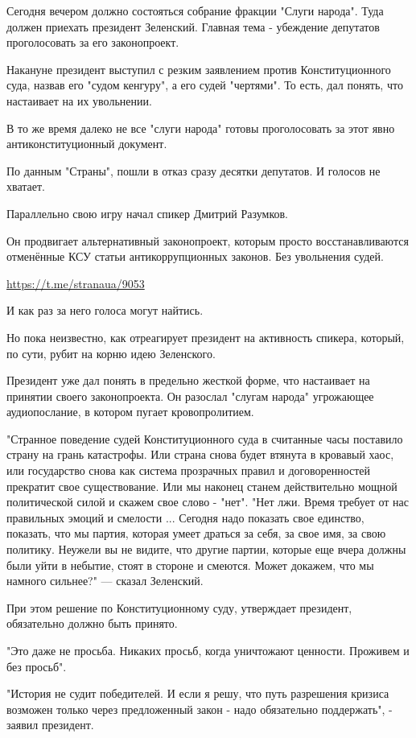 Сегодня вечером должно состояться собрание фракции "Слуги народа". Туда должен
приехать президент Зеленский. Главная тема - убеждение депутатов проголосовать
за его законопроект.

Накануне президент выступил с резким заявлением против Конституционного суда,
назвав его "судом кенгуру", а его судей "чертями". То есть, дал понять, что
настаивает на их увольнении.

В то же время далеко не все "слуги народа" готовы проголосовать за этот явно
антиконституционный документ.

По данным "Страны", пошли в отказ сразу десятки депутатов. И голосов не
хватает.

Параллельно свою игру начал спикер Дмитрий Разумков.  

Он продвигает альтернативный законопроект, которым просто восстанавливаются
отменённые КСУ статьи антикоррупционных законов. Без увольнения судей.

\url{https://t.me/stranaua/9053}

И как раз за него голоса могут найтись.

Но пока неизвестно, как отреагирует президент на активность спикера, который,
по сути, рубит на корню идею Зеленского.

Президент уже дал понять в предельно жесткой форме, что настаивает на принятии
своего законопроекта. Он разослал "слугам народа" угрожающее аудиопослание, в
котором пугает кровопролитием.

"Странное поведение судей Конституционного суда в считанные часы поставило
страну на грань катастрофы. Или страна снова будет втянута в кровавый хаос, или
государство снова как система прозрачных правил и договоренностей прекратит
свое существование. Или мы наконец станем действительно мощной политической
силой и скажем свое слово - "нет". "Нет лжи. Время требует от нас правильных
эмоций и смелости ... Сегодня надо показать свое единство, показать, что мы
партия, которая умеет драться за себя, за свое имя, за свою политику. Неужели
вы не видите, что другие партии, которые еще вчера должны были уйти в небытие,
стоят в стороне и смеются. Может докажем, что мы намного сильнее?" --- сказал
Зеленский.

При этом решение по Конституционному суду, утверждает президент, обязательно
должно быть принято.

"Это даже не просьба. Никаких просьб, когда уничтожают ценности. Проживем и без
просьб".

"История не судит победителей. И если я решу, что путь разрешения кризиса
возможен только через предложенный закон - надо обязательно поддержать", -
заявил президент. 

